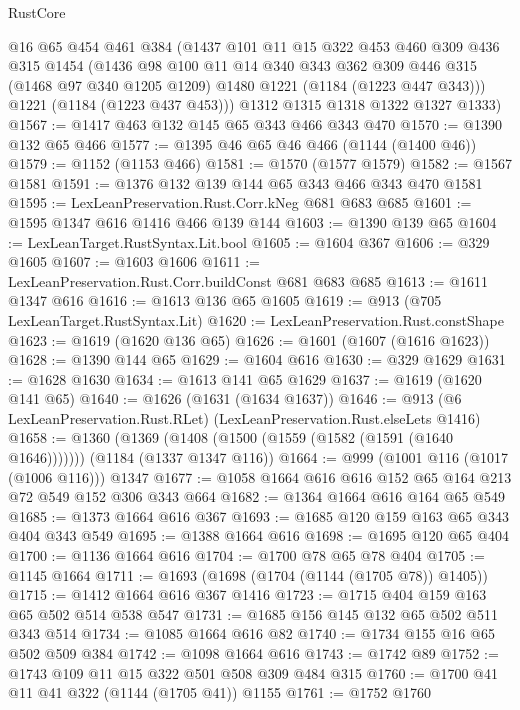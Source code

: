 \begin{lexlean}{RustCore}
\begin{coremodule}
      @16
      @65
      @454
      @461
      @384
      (@1437
        @101
        @11
        @15
        @322
        @453
        @460
        @309
        @436
        @315
        @1454
        (@1436
          @98
          @100
          @11
          @14
          @340
          @343
          @362
          @309
          @446
          @315
          (@1468 @97 @340 @1205 @1209)
          @1480
          @1221
          (@1184 (@1223 @447 @343)))
        @1221
        (@1184 (@1223 @437 @453)))
      @1312
      @1315
      @1318
      @1322
      @1327
      @1333)
@1567 := @1417 @463 @132 @145 @65 @343 @466 @343 @470
@1570 := @1390 @132 @65 @466
@1577 := @1395 @46 @65 @46 @466 (@1144 (@1400 @46))
@1579 := @1152 (@1153 @466)
@1581 := @1570 (@1577 @1579)
@1582 := @1567 @1581
@1591 := @1376 @132 @139 @144 @65 @343 @466 @343 @470 @1581
@1595 := LexLeanPreservation.Rust.Corr.kNeg @681 @683 @685
@1601 := @1595 @1347 @616 @1416 @466 @139 @144
@1603 := @1390 @139 @65
@1604 := LexLeanTarget.RustSyntax.Lit.bool
@1605 := @1604 @367
@1606 := @329 @1605
@1607 := @1603 @1606
@1611 := LexLeanPreservation.Rust.Corr.buildConst @681 @683 @685
@1613 := @1611 @1347 @616
@1616 := @1613 @136 @65 @1605
@1619 := @913 (@705 LexLeanTarget.RustSyntax.Lit)
@1620 := LexLeanPreservation.Rust.constShape
@1623 := @1619 (@1620 @136 @65)
@1626 := @1601 (@1607 (@1616 @1623))
@1628 := @1390 @144 @65
@1629 := @1604 @616
@1630 := @329 @1629
@1631 := @1628 @1630
@1634 := @1613 @141 @65 @1629
@1637 := @1619 (@1620 @141 @65)
@1640 := @1626 (@1631 (@1634 @1637))
@1646 := @913 (@6 LexLeanPreservation.Rust.RLet) (LexLeanPreservation.Rust.elseLets @1416)
@1658 := @1360
    (@1369 (@1408 (@1500 (@1559 (@1582 (@1591 (@1640 @1646)))))))
    (@1184 (@1337 @1347 @116))
@1664 := @999 (@1001 @116 (@1017 (@1006 @116))) @1347
@1677 := @1058 @1664 @616 @616 @152 @65 @164 @213 @72 @549 @152 @306 @343 @664
@1682 := @1364 @1664 @616 @164 @65 @549
@1685 := @1373 @1664 @616 @367
@1693 := @1685 @120 @159 @163 @65 @343 @404 @343 @549
@1695 := @1388 @1664 @616
@1698 := @1695 @120 @65 @404
@1700 := @1136 @1664 @616
@1704 := @1700 @78 @65 @78 @404
@1705 := @1145 @1664
@1711 := @1693 (@1698 (@1704 (@1144 (@1705 @78)) @1405))
@1715 := @1412 @1664 @616 @367 @1416
@1723 := @1715 @404 @159 @163 @65 @502 @514 @538 @547
@1731 := @1685 @156 @145 @132 @65 @502 @511 @343 @514
@1734 := @1085 @1664 @616 @82
@1740 := @1734 @155 @16 @65 @502 @509 @384
@1742 := @1098 @1664 @616
@1743 := @1742 @89
@1752 := @1743 @109 @11 @15 @322 @501 @508 @309 @484 @315
@1760 := @1700 @41 @11 @41 @322 (@1144 (@1705 @41)) @1155
@1761 := @1752 @1760

\end{coremodule}
\end{lexlean}
